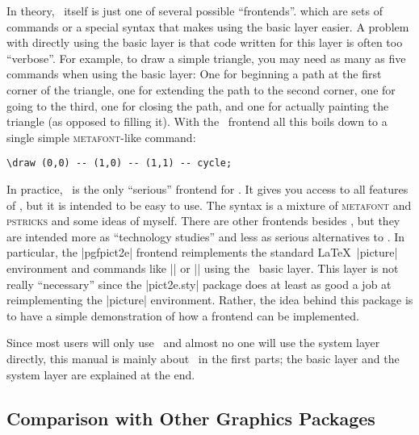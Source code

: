 In theory, \tikzname\ itself is just one of several possible ``frontends''.
which are sets of commands or a special syntax that makes using the basic layer
easier. A problem with directly using the basic layer is that code written for
this layer is often too ``verbose''. For example, to draw a simple triangle,
you may need as many as five commands when using the basic layer: One for
beginning a path at the first corner of the triangle, one for extending the
path to the second corner, one for going to the third, one for closing the
path, and one for actually painting the triangle (as opposed to filling it).
With the \tikzname\ frontend all this boils down to a single simple
\textsc{metafont}-like command:
%
\begin{verbatim}
\draw (0,0) -- (1,0) -- (1,1) -- cycle;
\end{verbatim}

In practice, \tikzname\ is the only ``serious'' frontend for \pgfname. It gives
you access to all features of \pgfname, but it is intended to be easy to use.
The syntax is a mixture of \textsc{metafont} and \textsc{pstricks} and some
ideas of myself. There are other frontends besides \tikzname, but they are intended
more as ``technology studies'' and less as serious alternatives to
\tikzname. In particular, the |pgfpict2e| frontend   reimplements the standard
\LaTeX\ |{picture}|  environment and commands like |\line| or |\vector| using
the \pgfname\ basic layer. This layer is not really ``necessary'' since the
|pict2e.sty| package does at least as good a job at reimplementing the
|{picture}| environment. Rather, the idea behind this package is to have a
simple demonstration of how a frontend can be implemented.

Since most users will only use \tikzname\ and almost no one will use the system
layer directly, this manual is mainly about \tikzname\ in the first parts; the
basic layer and the system layer are explained at the end.


\subsection{Comparison with Other Graphics Packages}

